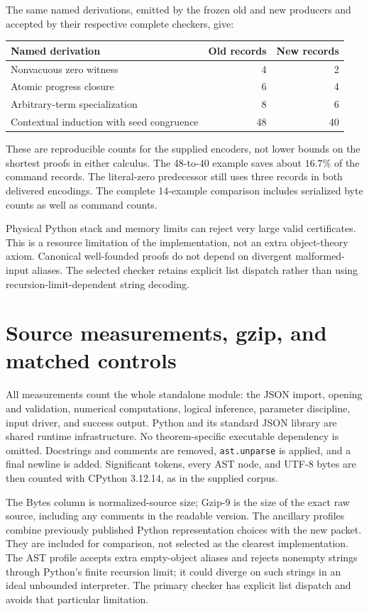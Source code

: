 The same named derivations, emitted by the frozen old and new producers
and accepted by their respective complete checkers, give:
\begin{center}\small
\begin{tabular}{lrr}
\toprule
Named derivation & Old records & New records\\
\midrule
Nonvacuous zero witness &4&2\\
Atomic progress closure &6&4\\
Arbitrary-term specialization &8&6\\
Contextual induction with seed congruence &48&40\\
\bottomrule
\end{tabular}
\end{center}
These are reproducible counts for the supplied encoders, not lower bounds
on the shortest proofs in either calculus. The 48-to-40 example saves
about $16.7\%$ of the command records. The literal-zero predecessor still
uses three records in both delivered encodings. The complete 14-example
comparison includes serialized byte counts as well as command counts.

Physical Python stack and memory limits can reject very large valid
certificates. This is a resource limitation of the implementation, not an
extra object-theory axiom. Canonical well-founded proofs do not depend on
divergent malformed-input aliases. The selected checker retains explicit
list dispatch rather than using recursion-limit-dependent string decoding.

\section{Source measurements, gzip, and matched controls}
\label{sec:measurements}

All measurements count the whole standalone module: the JSON import,
opening and validation, numerical computations, logical inference,
parameter discipline, input driver, and success output. Python and its
standard JSON library are shared runtime infrastructure. No
theorem-specific executable dependency is omitted. Docstrings and comments
are removed, \texttt{ast.unparse} is applied, and a final newline is added.
Significant tokens, every AST node, and UTF-8 bytes are then counted with
CPython 3.12.14, as in the supplied corpus.



The Bytes column is normalized-source size; Gzip-9 is the size of the
exact raw source, including any comments in the readable version. The
ancillary profiles combine previously published Python representation
choices with the new packet. They are included for comparison, not
selected as the clearest implementation. The AST profile accepts extra
empty-object aliases and rejects nonempty strings through Python's finite
recursion limit; it could diverge on such strings in an ideal unbounded
interpreter. The primary checker has explicit list dispatch and avoids
that particular limitation.

